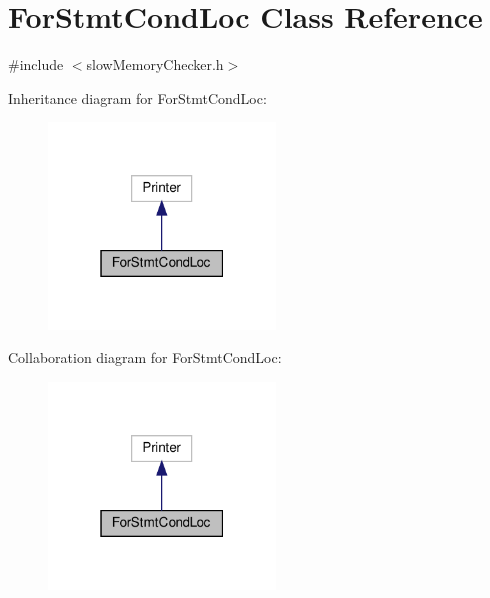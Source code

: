 \hypertarget{classForStmtCondLoc}{}\section{For\+Stmt\+Cond\+Loc Class Reference}
\label{classForStmtCondLoc}


{\ttfamily \#include $<$slow\+Memory\+Checker.\+h$>$}



Inheritance diagram for For\+Stmt\+Cond\+Loc\+:\nopagebreak
\begin{figure}[H]
\begin{center}
\leavevmode
\includegraphics[width=171pt]{classForStmtCondLoc__inherit__graph}
\end{center}
\end{figure}


Collaboration diagram for For\+Stmt\+Cond\+Loc\+:\nopagebreak
\begin{figure}[H]
\begin{center}
\leavevmode
\includegraphics[width=171pt]{classForStmtCondLoc__coll__graph}
\end{center}
\end{figure}
